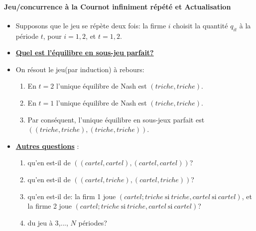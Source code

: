 \documentclass[notes, ignorenonframetext, compress, 9pt, xcolor=svgnames, aspectratio=169]{beamer}
\begin{document}
\begin{frame}
[allowframebreaks]{\insertsection}
\framesubtitle{Jeu/concurrence à la Cournot infiniment répété et Actualisation\\}
   \begin{itemize}
        \item Supposons que le jeu se répète deux fois: la firme $i$ choisit 
        la quantité $q_{it}$ à la période $t$, pour $i=1, 2$, et $t=1, 2$.
        \item \textbf{\underline{Quel est l'équilibre en sous-jeu parfait?}} 
        \item On résout le jeu(par induction) à rebours:
        \begin{enumerate}[-]
            \item En $t=2$ l'unique équilibre de Nash est $(triche, triche)$.
            \item En $t=1$ l'unique équilibre de Nash est $(triche, triche)$.
            \item Par conséquent, l'unique équilibre en sous-jeux parfait est $\left( 
                (triche, triche), (triche, triche)
            \right)$.
        \end{enumerate}
        \item \textbf{\underline{Autres questions}} : 
        \begin{enumerate}[-]
         \item qu'en est-il de $\left((cartel,cartel), (cartel,cartel)\right)$? 
         \item qu'en est-il de $\left((cartel, triche), (cartel, triche)\right)$?
         \item qu'en est-il de: la firm 1 joue $(cartel; triche \ \text{si} \ triche, cartel  \ \text{si} \ cartel)$,
          et la firme 2 joue $(cartel; triche \ \text{si} \ triche, cartel  \ \text{si} \ cartel)$?
        \item du jeu à 3,..., $N$ périodes?
\end{enumerate}
\end{itemize}
\end{frame}
\end{document}
